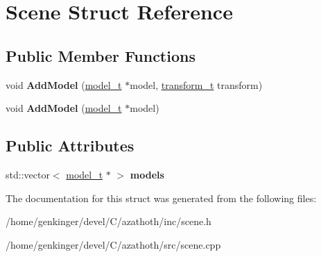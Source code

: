 \hypertarget{structScene}{}\section{Scene Struct Reference}
\label{structScene}
\subsection*{Public Member Functions}
\begin{DoxyCompactItemize}
\item 
\mbox{\label{structScene_a51955a8f6054d82bd9a7cbdd8b1ed33d}} 
void {\bfseries Add\+Model} (\mbox{\hyperlink{structmodel__t}{model\+\_\+t}} $\ast$model, \mbox{\hyperlink{structtransform__t}{transform\+\_\+t}} transform)
\item 
\mbox{\label{structScene_a7f89b07e8d3af153d8e76e03b916d423}} 
void {\bfseries Add\+Model} (\mbox{\hyperlink{structmodel__t}{model\+\_\+t}} $\ast$model)
\end{DoxyCompactItemize}
\subsection*{Public Attributes}
\begin{DoxyCompactItemize}
\item 
\mbox{\label{structScene_a5ad25b28c449cdf1ec6eda9fe1a89248}} 
std\+::vector$<$ \mbox{\hyperlink{structmodel__t}{model\+\_\+t}} $\ast$ $>$ {\bfseries models}
\end{DoxyCompactItemize}


The documentation for this struct was generated from the following files\+:\begin{DoxyCompactItemize}
\item 
/home/genkinger/devel/\+C/azathoth/inc/scene.\+h\item 
/home/genkinger/devel/\+C/azathoth/src/scene.\+cpp\end{DoxyCompactItemize}
